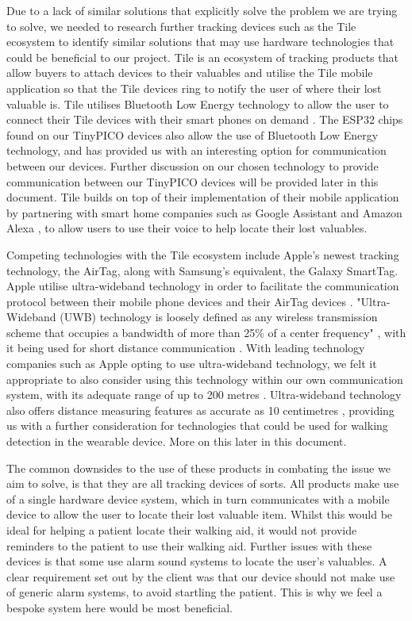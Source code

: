 \documentclass[12pt, a4paper]{report}
\begin{document}
Due to a lack of similar solutions that explicitly solve the problem we are trying to solve, we needed to research further tracking devices such as the Tile ecosystem to identify similar solutions that may use hardware technologies that could be beneficial to our project. Tile is an ecosystem of tracking products that allow buyers to attach devices to their valuables and utilise the Tile mobile application so that the Tile devices ring to notify the user of where their lost valuable is. Tile utilises Bluetooth Low Energy technology to allow the user to connect their Tile devices with their smart phones on demand \cite{hall_2021}. The ESP32 chips found on our TinyPICO devices also allow the use of Bluetooth Low Energy technology, and has provided us with an interesting option for communication between our devices. Further discussion on our chosen technology to provide communication between our TinyPICO devices will be provided later in this document. Tile builds on top of their implementation of their mobile application by partnering with smart home companies such as Google Assistant and Amazon Alexa \cite{hall_2021}, to allow users to use their voice to help locate their lost valuables. 

Competing technologies with the Tile ecosystem include Apple's newest tracking technology, the AirTag, along with Samsung's equivalent, the Galaxy SmartTag. Apple utilise ultra-wideband technology in order to facilitate the communication protocol between their mobile phone devices and their AirTag devices \cite{griffith_2021}. "Ultra-Wideband (UWB) technology is loosely defined as any wireless transmission scheme that occupies a bandwidth of more than 25\% of a center frequency" \cite{Foerster_ultra-widebandtechnology}, with it being used for short distance communication \cite{uwb}. With leading technology companies such as Apple opting to use ultra-wideband technology, we felt it appropriate to also consider using this technology within our own communication system, with its adequate range of up to 200 metres \cite{bleesk}. Ultra-wideband technology also offers distance measuring features as accurate as 10 centimetres \cite{bleesk}, providing us with a further consideration for technologies that could be used for walking detection in the wearable device. More on this later in this document. 

The common downsides to the use of these products in combating the issue we aim to solve, is that they are all tracking devices of sorts. All products make use of a single hardware device system, which in turn communicates with a mobile device to allow the user to locate their lost valuable item. Whilst this would be ideal for helping a patient locate their walking aid, it would not provide reminders to the patient to use their walking aid. Further issues with these devices is that some use alarm sound systems to locate the user's valuables. A clear requirement set out by the client was that our device should not make use of generic alarm systems, to avoid startling the patient. This is why we feel a bespoke system here would be most beneficial. 
\end{document}
